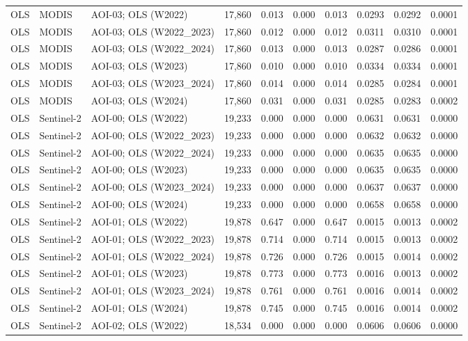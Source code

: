 \begin{landscape}
\begin{longtable}{lllrrrrrrr}
OLS & MODIS & AOI-03; OLS (W2022) & 17,860 & 0.013 & 0.000 & 0.013 & 0.0293 & 0.0292 & 0.0001 \\
OLS & MODIS & AOI-03; OLS (W2022\_2023) & 17,860 & 0.012 & 0.000 & 0.012 & 0.0311 & 0.0310 & 0.0001 \\
OLS & MODIS & AOI-03; OLS (W2022\_2024) & 17,860 & 0.013 & 0.000 & 0.013 & 0.0287 & 0.0286 & 0.0001 \\
OLS & MODIS & AOI-03; OLS (W2023) & 17,860 & 0.010 & 0.000 & 0.010 & 0.0334 & 0.0334 & 0.0001 \\
OLS & MODIS & AOI-03; OLS (W2023\_2024) & 17,860 & 0.014 & 0.000 & 0.014 & 0.0285 & 0.0284 & 0.0001 \\
OLS & MODIS & AOI-03; OLS (W2024) & 17,860 & 0.031 & 0.000 & 0.031 & 0.0285 & 0.0283 & 0.0002 \\
OLS & Sentinel-2 & AOI-00; OLS (W2022) & 19,233 & 0.000 & 0.000 & 0.000 & 0.0631 & 0.0631 & 0.0000 \\
OLS & Sentinel-2 & AOI-00; OLS (W2022\_2023) & 19,233 & 0.000 & 0.000 & 0.000 & 0.0632 & 0.0632 & 0.0000 \\
OLS & Sentinel-2 & AOI-00; OLS (W2022\_2024) & 19,233 & 0.000 & 0.000 & 0.000 & 0.0635 & 0.0635 & 0.0000 \\
OLS & Sentinel-2 & AOI-00; OLS (W2023) & 19,233 & 0.000 & 0.000 & 0.000 & 0.0635 & 0.0635 & 0.0000 \\
OLS & Sentinel-2 & AOI-00; OLS (W2023\_2024) & 19,233 & 0.000 & 0.000 & 0.000 & 0.0637 & 0.0637 & 0.0000 \\
OLS & Sentinel-2 & AOI-00; OLS (W2024) & 19,233 & 0.000 & 0.000 & 0.000 & 0.0658 & 0.0658 & 0.0000 \\
OLS & Sentinel-2 & AOI-01; OLS (W2022) & 19,878 & 0.647 & 0.000 & 0.647 & 0.0015 & 0.0013 & 0.0002 \\
OLS & Sentinel-2 & AOI-01; OLS (W2022\_2023) & 19,878 & 0.714 & 0.000 & 0.714 & 0.0015 & 0.0013 & 0.0002 \\
OLS & Sentinel-2 & AOI-01; OLS (W2022\_2024) & 19,878 & 0.726 & 0.000 & 0.726 & 0.0015 & 0.0014 & 0.0002 \\
OLS & Sentinel-2 & AOI-01; OLS (W2023) & 19,878 & 0.773 & 0.000 & 0.773 & 0.0016 & 0.0013 & 0.0002 \\
OLS & Sentinel-2 & AOI-01; OLS (W2023\_2024) & 19,878 & 0.761 & 0.000 & 0.761 & 0.0016 & 0.0014 & 0.0002 \\
OLS & Sentinel-2 & AOI-01; OLS (W2024) & 19,878 & 0.745 & 0.000 & 0.745 & 0.0016 & 0.0014 & 0.0002 \\
OLS & Sentinel-2 & AOI-02; OLS (W2022) & 18,534 & 0.000 & 0.000 & 0.000 & 0.0606 & 0.0606 & 0.0000 \\

\end{longtable}
\end{landscape}
